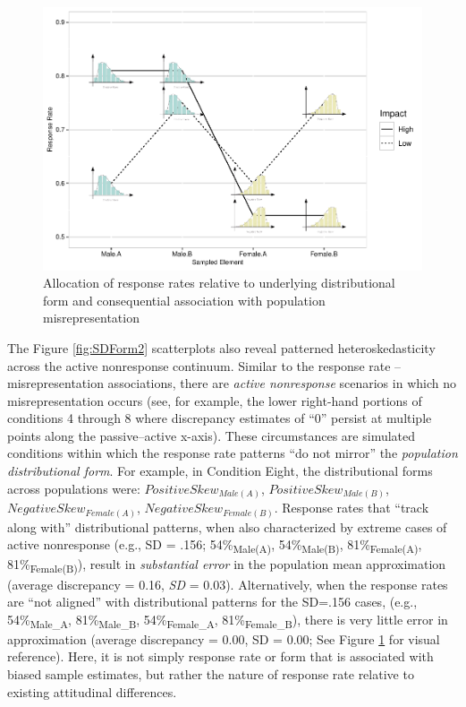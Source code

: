 \documentclass[
  man,mask]{apa7}
\begin{document}
\begin{figure}
\centering
\includegraphics{paper_files/figure-latex/CattelExplain-1.pdf}
\caption{\label{fig:CattelExplain}Allocation of response rates relative to underlying distributional form and consequential association with population misrepresentation}
\end{figure}

The Figure \ref{fig:SDForm2} scatterplots also reveal patterned heteroskedasticity across the active nonresponse continuum. Similar to the response rate -- misrepresentation associations, there are \emph{active nonresponse} scenarios in which no misrepresentation occurs (see, for example, the lower right-hand portions of conditions 4 through 8 where discrepancy estimates of ``0'' persist at multiple points along the passive--active x-axis). These circumstances are simulated conditions within which the response rate patterns ``do not mirror'' the \emph{population distributional form}. For example, in Condition Eight, the distributional forms across populations were: \(Positive Skew_{Male(A)}\), \(Positive Skew_{Male(B)}\), \(Negative Skew_{Female(A)}\), \(Negative Skew_{Female(B)}\). Response rates that ``track along with'' distributional patterns, when also characterized by extreme cases of active nonresponse (e.g., SD = .156; 54\%\textsubscript{Male(A)}, 54\%\textsubscript{Male(B)}, 81\%\textsubscript{Female(A)}, 81\%\textsubscript{Female(B)}), result in \emph{substantial error} in the population mean approximation (average discrepancy = 0.16, \emph{SD} = 0.03). Alternatively, when the response rates are ``not aligned'' with distributional patterns for the SD=.156 cases, (e.g., 54\%\textsubscript{Male\_A}, 81\%\textsubscript{Male\_B}, 54\%\textsubscript{Female\_A}, 81\%\textsubscript{Female\_B}), there is very little error in approximation (average discrepancy = 0.00, SD = 0.00; See Figure \ref{fig:CattelExplain} for visual reference). Here, it is not simply response rate or form that is associated with biased sample estimates, but rather the nature of response rate relative to existing attitudinal differences.
\end{document}
